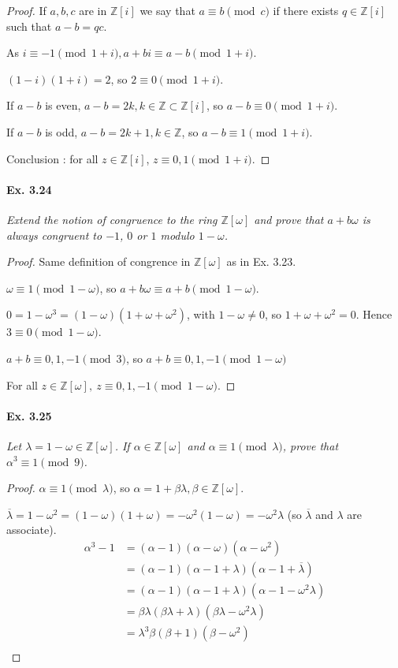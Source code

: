 \documentclass[11pt,a4paper]{article}
\newcommand{\Z}{\mathbb{Z}}
\begin{document}
{\begin{proof}
If $a,b,c$ are in $\Z[i]$ we say that $a\equiv b \pmod c$ if there exists $q \in \Z[i]$ such that $a-b = qc$.

As $i\equiv -1 \pmod{1+i}, a+bi \equiv a-b \pmod {1+i}$.

$(1-i)(1+i) = 2$, so $2\equiv 0 \pmod{1+i}$.

If $a-b$ is even, $a-b =2k,k\in \Z \subset \Z[i]$, so $a-b \equiv 0 \pmod{1+i}$.

If $a-b$ is odd, $a-b = 2k+1, k \in \Z$, so $a-b \equiv 1 \pmod {1+i}$.

Conclusion : for all $z \in \Z[i]$, $z\equiv0,1 \pmod{1+i}$.
\end{proof}

\paragraph{Ex. 3.24}

{\it Extend the notion of congruence to the ring $\Z[\omega]$ and prove that $a + b\omega$ is always congruent to $-1$, $0$ or $1$ modulo $1 - \omega$.
}

\begin{proof}
Same definition of congrence in $\Z[\omega]$ as in Ex. 3.23.

$\omega \equiv 1 \pmod{1-\omega}$, so $a+b\omega \equiv a+b \pmod{1-\omega}$.

$0 = 1-\omega^3 = (1- \omega)(1+\omega+\omega^2)$, with $1-\omega \neq 0$, so  $1+\omega+\omega^2 = 0$. Hence $3 \equiv 0 \pmod{1-\omega}$.

$a+b \equiv 0,1,-1 \pmod 3$, so $a+b \equiv 0,1,-1 \pmod {1-\omega}$

For all $z \in \Z[\omega],\  z \equiv 0,1,-1 \pmod{1-\omega}$.
\end{proof}

\paragraph{Ex. 3.25} 

{\it Let $\lambda = 1 -\omega \in \Z[\omega]$. If $\alpha \in \Z[\omega]$ and $\alpha \equiv 1 \pmod \lambda$, prove that $\alpha^3 \equiv 1 \pmod 9$.
}

\begin{proof} 
$\alpha \equiv 1 \pmod \lambda$, so $\alpha = 1 + \beta \lambda, \beta \in \Z[\omega]$.

$\overline{\lambda} = 1 - \omega^2 = (1-\omega)(1+\omega) = -\omega^2(1-\omega) = -\omega^2 \lambda$ (so $\overline{\lambda}$ and $\lambda$ are associate).
\begin{align*}
\alpha^3-1&=(\alpha-1)(\alpha-\omega)(\alpha-\omega^2)\\
&=(\alpha-1)(\alpha-1+\lambda)(\alpha-1+\overline{\lambda})\\
&=(\alpha-1)(\alpha-1+\lambda)(\alpha-1-\omega^2\lambda)\\
&=\beta \lambda (\beta\lambda + \lambda) (\beta \lambda - \omega^2\lambda)\\
&=\lambda^3 \beta (\beta+1)(\beta-\omega^2)\\
\end{align*}


\end{proof}}
\end{document}
